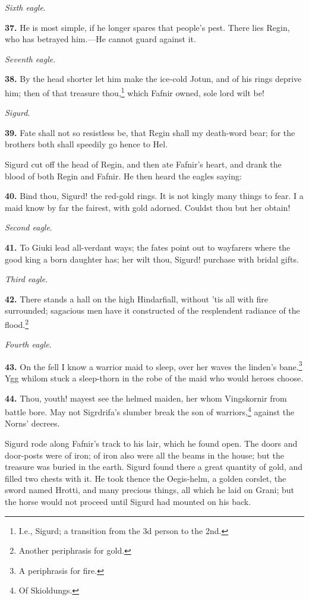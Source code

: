 \emph{Sixth eagle}.

\textbf{37.} He is most simple, if he longer spares that people's pest. There
lies Regin, who has betrayed him.—He cannot guard against it.

\emph{Seventh eagle}.

\textbf{38.} By the head shorter let him make the ice-cold Jotun, and of his
rings deprive him; then of that treasure thou,\footnote{I.e., Sigurd; a transition from the 3d person to the
2nd.} which Fafnir owned,
sole lord wilt be!

\emph{Sigurd}.

\textbf{39.} Fate shall not so resistless be, that Regin shall my death-word
bear; for the brothers both shall speedily go hence to Hel.

Sigurd cut off the head of Regin, and then ate Fafnir's heart, and
drank the blood of both Regin and Fafnir. He then heard the eagles
saying:

\textbf{40.} Bind thou, Sigurd! the red-gold rings. It is not kingly many
things to fear. I a maid know by far the fairest, with gold adorned.
Couldst thou but her obtain!

\emph{Second eagle}.

\textbf{41.} To Giuki lead all-verdant ways; the fates point out to
wayfarers where the good king a born daughter has; her wilt thou,
Sigurd! purchase with bridal gifts.

\emph{Third eagle}.

\textbf{42.} There stands a hall on the high Hindarfiall, without 'tis all
with fire surrounded; sagacious men have it constructed of the
resplendent radiance of the flood.\footnote{Another periphrasis for gold.}

\emph{Fourth eagle}.

\textbf{43.} On the fell I know a warrior maid to sleep, over her waves the
linden's bane.\footnote{A periphrasis for fire.} Ygg whilom stuck a sleep-thorn in the robe of the
maid who would heroes choose.

\textbf{44.} Thou, youth! mayest see the helmed maiden, her whom Vingskornir
from battle bore. May not Sigrdrifa's slumber break the son of
warriors,\footnote{Of Skioldungs.} against the Norns' decrees.

Sigurd rode along Fafnir's track to his lair, which he found open. The
doors and door-posts were of iron; of iron also were all the beams in
the house; but the treasure was buried in the earth. Sigurd found
there a great quantity of gold, and filled two chests with it. He took
thence the Oegis-helm, a golden corslet, the sword named Hrotti, and
many precious things, all which he laid on Grani; but the horse would
not proceed until Sigurd had mounted on his back.

